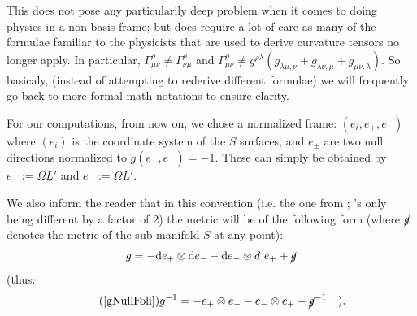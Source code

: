 \documentclass[a4paper,11pt]{article}
\numberwithin{equation}{section}
\theoremstyle{definition}
\renewcommand{\d}{{\mathrm{d}}}
\begin{document}
This does not pose any particularily deep problem when it comes to doing physics in a non-basis frame; but does require a lot of care as many of the formulae familiar to the physicists that are used to derive curvature tensors no longer apply. In particular, $\Gamma_{\mu\nu}^\rho\ne\Gamma_{\nu\mu}^\rho$ and $\Gamma_{\mu\nu}^\rho\ne g^{\rho\lambda}(g_{\lambda\mu,\nu}+g_{\lambda\nu,\mu}+g_{\mu\nu,\lambda})$. So basicaly, (instead of attempting to rederive different formulae) we will frequently go back to more formal math notations to ensure clarity.

For our computations, from now on, we chose a normalized frame: $(e_i,e_+,e_-)$ where $(e_i)$ is the coordinate system of the $S$ surfaces, and $e_\pm$ are two null directions normalized to $g(e_+,e_-)=-1$. These can simply be obtained by $e_+:=\Omega\underline{L}'$ and $e_-:=\Omega L'$.

We also inform the reader that in this convention (i.e. the one from \cite{Art}; \cite{Chris}'s only being different by a factor of 2) the metric will be of the following form (where $\cancel{g}$ denotes the metric of the sub-manifold $S$ at any point):
\begin{equation} \label{gNullFoli}
    g=-\d e_+\otimes \d e_- - \d e_-\otimes d\ e_+ + \cancel{g}
\end{equation}
(thus:
\begin{equation}\tag{\ref{gNullFoli}}
g^{-1}=-e_+\otimes e_- - e_-\otimes e_+ + \cancel{g}^{-1} \quad ).
\end{equation}
\end{document}
